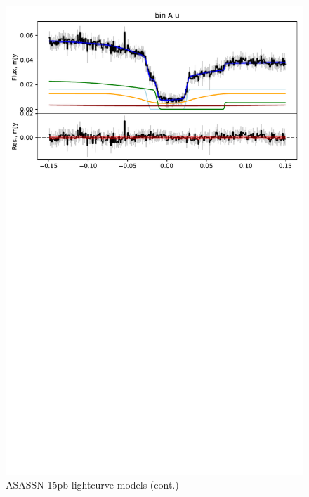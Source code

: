 \begin{figure}
    \centering
    \includegraphics[width=\textwidth]{figures/results/ASASSN-15pb/ASASSN-15pb_2.pdf}
    \caption{ASASSN-15pb lightcurve models (cont.)}
    \label{fig:ASASSN-15pb all lightcurves cont 1}
\end{figure}

